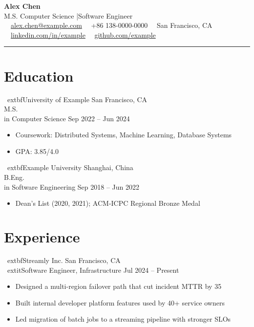 \documentclass[11pt,a4paper]{article}
\begin{document}
\color{ink}

\begin{center}
  {\Huge\bfseries Alex Chen}\\[0.35em]
  {\large M.S. Computer Science \quad|\quad Software Engineer}\\[0.4em]
  {\small\color{muted}
    \faEnvelope~~\href{mailto:alex.chen@example.com}{alex.chen@example.com}
    \quad
    \faPhone~~+86 138-0000-0000
    \quad
    \faMapMarker~~San Francisco, CA
    \quad
    \faLinkedin~~\href{https://linkedin.com/in/example}{linkedin.com/in/example}
    \quad
    \faGithub~~\href{https://github.com/example}{github.com/example}}
\end{center}

\vspace{0.2em}
{\color{accent}\rule{\	extwidth}{1.3pt}}

\section{Education}
\	extbf{University of Example} \hfill San Francisco, CA\\
M.S.\\ in Computer Science \hfill Sep 2022 -- Jun 2024\\
\begin{itemize}
  \item Coursework: Distributed Systems, Machine Learning, Database Systems
  \item GPA: 3.85/4.0
\end{itemize}

\	extbf{Example University} \hfill Shanghai, China\\
B.Eng.\\ in Software Engineering \hfill Sep 2018 -- Jun 2022\\
\begin{itemize}
  \item Dean's List (2020, 2021); ACM-ICPC Regional Bronze Medal
\end{itemize}

\section{Experience}
\	extbf{Streamly Inc.} \hfill San Francisco, CA\\
\	extit{Software Engineer, Infrastructure} \hfill Jul 2024 -- Present
\begin{itemize}
  \item Designed a multi-region failover path that cut incident MTTR by 35\\%
  \item Built internal developer platform features used by 40+ service owners
  \item Led migration of batch jobs to a streaming pipeline with stronger SLOs
\end{itemize}
\end{document}

